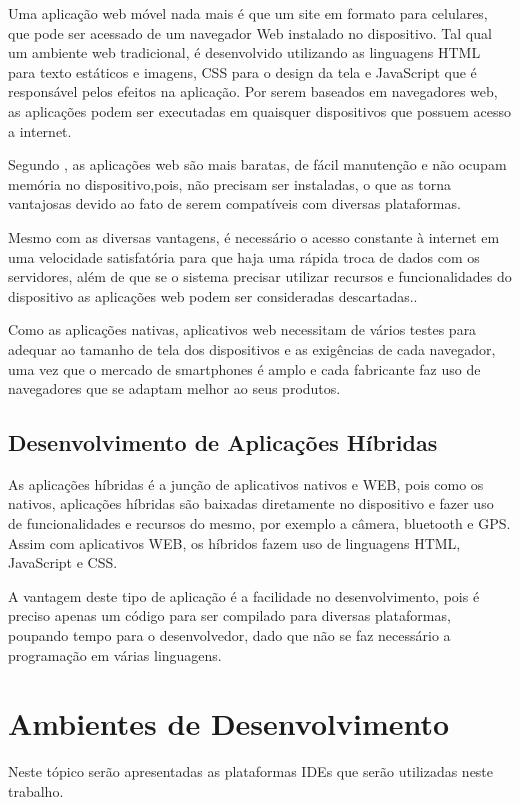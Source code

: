 Uma aplicação web móvel nada mais é que um site em formato para celulares, que pode ser acessado de um navegador Web instalado no dispositivo. Tal qual um ambiente web tradicional, é desenvolvido utilizando as linguagens HTML para texto estáticos e imagens, CSS para o design da tela e JavaScript que é responsável pelos efeitos na aplicação. Por serem baseados em navegadores web, as aplicações podem ser executadas em quaisquer dispositivos que possuem acesso a internet.\cite{emdesafios}

Segundo , as aplicações web são mais baratas, de fácil manutenção e não ocupam memória no dispositivo,pois, não precisam ser instaladas, o que as torna vantajosas devido ao fato de serem compatíveis com diversas plataformas.

Mesmo com as diversas vantagens, é necessário o acesso constante à internet em uma velocidade satisfatória para que haja uma rápida troca de dados com os servidores, além de que se o sistema precisar utilizar recursos e funcionalidades do dispositivo as aplicações web podem ser consideradas descartadas.\cite{toledo2016desenvolvimento}.

Como as aplicações nativas, aplicativos web necessitam de vários testes para adequar ao tamanho de tela dos dispositivos e as exigências de cada navegador, uma vez que o mercado de smartphones é amplo e cada fabricante faz uso de navegadores que se adaptam melhor ao seus produtos.

\subsection{Desenvolvimento de Aplicações Híbridas}

As  aplicações híbridas é a junção de aplicativos nativos e WEB, pois como os nativos, aplicações híbridas são baixadas diretamente no dispositivo e fazer uso de funcionalidades e recursos do mesmo, por exemplo a câmera, bluetooth e GPS. Assim com aplicativos WEB, os híbridos fazem uso de linguagens HTML, JavaScript e CSS. \cite{tavares2016introduccao}

A vantagem deste tipo de aplicação é a facilidade no desenvolvimento, pois é preciso apenas um código para ser compilado para diversas plataformas, poupando tempo para o  desenvolvedor, dado que não se faz necessário a programação em várias linguagens.

\section{Ambientes de Desenvolvimento}
Neste tópico serão apresentadas as plataformas IDEs que serão utilizadas neste trabalho.

